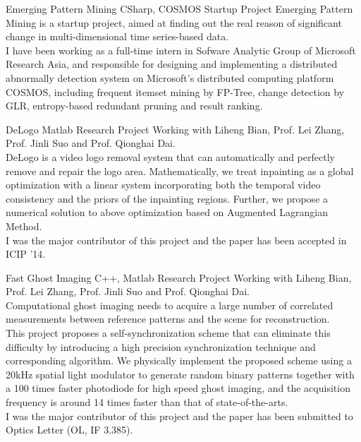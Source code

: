 \documentclass[11pt,a4paper]{moderncv}
\begin{document}
{Emerging Pattern Mining}
{CSharp, COSMOS}
{Startup Project}{}
{
Emerging Pattern Mining is a startup project, aimed at finding out the real reason of significant change in multi-dimensional time series-based data.\\
I have been working as a full-time intern in Sofware Analytic Group of Microsoft Research Asia, and responsible for designing and implementing a distributed abnormally detection system on Microsoft's distributed computing platform COSMOS, including frequent itemset mining by FP-Tree, change detection by GLR, entropy-based redundant pruning and result ranking.
}

\vspace*{0.2\baselineskip}
{DeLogo}
{Matlab}
{Research Project}{}
{Working with Liheng Bian, Prof. Lei Zhang, Prof. Jinli Suo and Prof. Qionghai Dai. \\
DeLogo is a video logo removal system that can automatically and perfectly remove and repair the logo area. Mathematically, we treat inpainting as a global optimization with a linear system incorporating both the temporal video consistency and the priors of the inpainting regions. Further, we propose a numerical solution to above optimization based on Augmented Lagrangian
Method. \\
I was the major contributor of this project and the paper has been accepted in ICIP '14.
}

\vspace*{0.2\baselineskip}
{Fast Ghost Imaging}
{C++, Matlab}
{Research Project}{}
{Working with Liheng Bian, Prof. Lei Zhang, Prof. Jinli Suo and Prof. Qionghai Dai. \\
Computational ghost imaging needs to acquire a large number of correlated measurements between reference patterns and the scene for reconstruction.\\
This project proposes a self-synchronization scheme that can eliminate this difficulty by introducing a high precision synchronization technique and corresponding algorithm. We physically implement the proposed scheme using a 20kHz spatial light modulator to generate random binary patterns together with a 100 times faster photodiode for high speed ghost imaging, and the acquisition frequency is around 14 times faster than that of state-of-the-arts. \\
I was the major contributor of this project and the paper has been submitted to Optics Letter (OL, IF 3.385).
}
\end{document}
